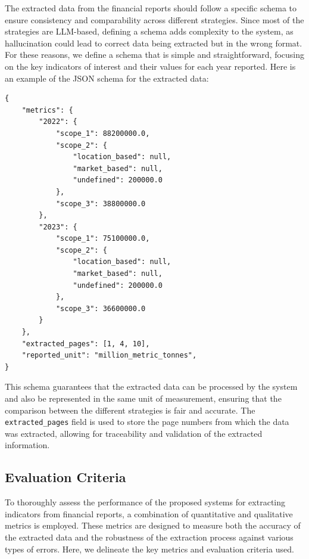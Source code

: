 \documentclass[english, 12pt, a4paper, elec, utf8, a-2b, online]{aaltothesis}
\begin{document}
The extracted data from the financial reports should follow a specific schema to ensure consistency and comparability across different strategies.
Since most of the strategies are \ac{LLM}-based, defining a schema adds complexity to the system, as hallucination could lead to correct data being extracted but in the wrong format.
For these reasons, we define a schema that is simple and straightforward, focusing on the key indicators of interest and their values for each year reported.
Here is an example of the \ac{JSON} schema for the extracted data:

\begin{verbatim}
{
    "metrics": {
        "2022": {
            "scope_1": 88200000.0,
            "scope_2": {
                "location_based": null,
                "market_based": null,
                "undefined": 200000.0
            },
            "scope_3": 38800000.0
        },
        "2023": {
            "scope_1": 75100000.0,
            "scope_2": {
                "location_based": null,
                "market_based": null,
                "undefined": 200000.0
            },
            "scope_3": 36600000.0
        }
    },
    "extracted_pages": [1, 4, 10],
    "reported_unit": "million_metric_tonnes",
}
\end{verbatim}

This schema guarantees that the extracted data can be processed by the system and also be represented in the same unit of measurement, ensuring that the comparison between the different strategies is fair and accurate.
The \texttt{extracted\_pages} field is used to store the page numbers from which the data was extracted, allowing for traceability and validation of the extracted information.

\subsection{Evaluation Criteria}

To thoroughly assess the performance of the proposed systems for extracting indicators from financial reports, a combination of quantitative and qualitative metrics is employed.
These metrics are designed to measure both the accuracy of the extracted data and the robustness of the extraction process against various types of errors.
Here, we delineate the key metrics and evaluation criteria used.
\end{document}
